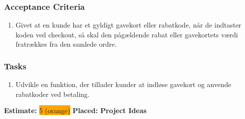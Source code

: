 \subsubsection*{\textbf{Acceptance Criteria}}
\begin{enumerate}
  \item Givet at en kunde har et gyldigt gavekort eller rabatkode, når de indtaster koden ved checkout, så skal den pågældende rabat eller gavekortets værdi fratrækkes fra den samlede ordre.
\end{enumerate}
\subsubsection*{\textbf{Tasks}}
\begin{enumerate}
  \item Udvikle en funktion, der tillader kunder at indløse gavekort og anvende rabatkoder ved betaling.
\end{enumerate}
\textbf{Estimate:} \colorbox{orange}{5 (orange)}
\textbf{Placed: Project Ideas}
\par\noindent\dotfill